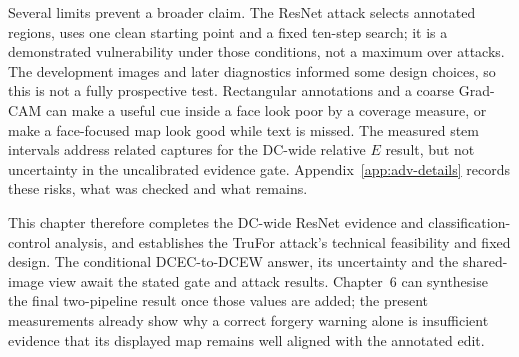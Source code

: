 Several limits prevent a broader claim. The ResNet attack selects annotated regions, uses one clean starting point and a fixed ten-step search; it is a demonstrated vulnerability under those conditions, not a maximum over attacks. The development images and later diagnostics informed some design choices, so this is not a fully prospective test. Rectangular annotations and a coarse Grad-CAM can make a useful cue inside a face look poor by a coverage measure, or make a face-focused map look good while text is missed. The measured stem intervals address related captures for the DC-wide relative $E$ result, but not uncertainty in the uncalibrated evidence gate. Appendix~\ref{app:adv-details} records these risks, what was checked and what remains.

This chapter therefore completes the DC-wide ResNet evidence and classification-control analysis, and establishes the TruFor attack's technical feasibility and fixed design. The conditional DCEC-to-DCEW answer, its uncertainty and the shared-image view await the stated gate and attack results. Chapter~6 can synthesise the final two-pipeline result once those values are added; the present measurements already show why a correct forgery warning alone is insufficient evidence that its displayed map remains well aligned with the annotated edit.
